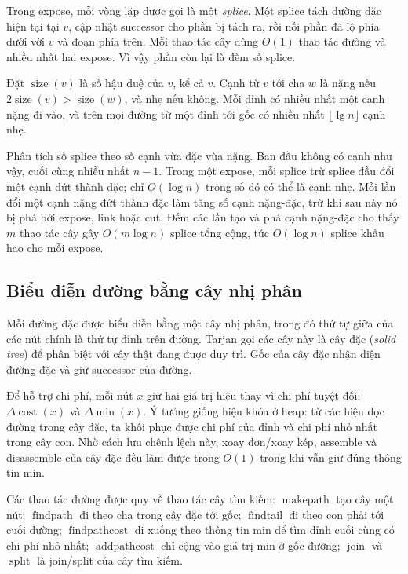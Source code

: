 \documentclass[11pt]{article}
\begin{document}
Trong expose, mỗi vòng lặp được gọi là một \emph{splice}. Một splice tách đường
đặc hiện tại tại \(v\), cập nhật successor cho phần bị tách ra, rồi nối phần đã
lộ phía dưới với \(v\) và đoạn phía trên. Mỗi thao tác cây dùng \(O(1)\) thao tác
đường và nhiều nhất hai expose. Vì vậy phần còn lại là đếm số splice.

Đặt \(\operatorname{size}(v)\) là số hậu duệ của \(v\), kể cả \(v\). Cạnh từ
\(v\) tới cha \(w\) là nặng nếu \(2\operatorname{size}(v)>\operatorname{size}(w)\),
và nhẹ nếu không. Mỗi đỉnh có nhiều nhất một cạnh nặng đi vào, và trên mọi
đường từ một đỉnh tới gốc có nhiều nhất \(\lfloor\lg n\rfloor\) cạnh nhẹ.

Phân tích số splice theo số cạnh vừa đặc vừa nặng. Ban đầu không có cạnh như
vậy, cuối cùng nhiều nhất \(n-1\). Trong một expose, mỗi splice trừ splice đầu
đổi một cạnh đứt thành đặc; chỉ \(O(\log n)\) trong số đó có thể là cạnh nhẹ.
Mỗi lần đổi một cạnh nặng đứt thành đặc làm tăng số cạnh nặng-đặc, trừ khi sau
này nó bị phá bởi expose, link hoặc cut. Đếm các lần tạo và phá cạnh nặng-đặc
cho thấy \(m\) thao tác cây gây \(O(m\log n)\) splice tổng cộng, tức
\(O(\log n)\) splice khấu hao cho mỗi expose.

\subsection*{Biểu diễn đường bằng cây nhị phân}

Mỗi đường đặc được biểu diễn bằng một cây nhị phân, trong đó thứ tự giữa của
các nút chính là thứ tự đỉnh trên đường. Tarjan gọi các cây này là cây đặc
(\emph{solid tree}) để phân biệt với cây thật đang được duy trì. Gốc của cây đặc
nhận diện đường đặc và giữ successor của đường.

Để hỗ trợ chi phí, mỗi nút \(x\) giữ hai giá trị hiệu thay vì chi phí tuyệt đối:
\(\Delta\operatorname{cost}(x)\) và \(\Delta\min(x)\). Ý tưởng giống hiệu khóa ở
heap: từ các hiệu dọc đường trong cây đặc, ta khôi phục được chi phí của đỉnh và
chi phí nhỏ nhất trong cây con. Nhờ cách lưu chênh lệch này, xoay đơn/xoay kép,
assemble và disassemble của cây đặc đều làm được trong \(O(1)\) trong khi vẫn
giữ đúng thông tin min.

Các thao tác đường được quy về thao tác cây tìm kiếm:
\(\operatorname{makepath}\) tạo cây một nút;
\(\operatorname{findpath}\) đi theo cha trong cây đặc tới gốc;
\(\operatorname{findtail}\) đi theo con phải tới cuối đường;
\(\operatorname{findpathcost}\) đi xuống theo thông tin min để tìm đỉnh cuối
cùng có chi phí nhỏ nhất;
\(\operatorname{addpathcost}\) chỉ cộng vào giá trị min ở gốc đường;
\(\operatorname{join}\) và \(\operatorname{split}\) là join/split của cây tìm
kiếm.
\end{document}
